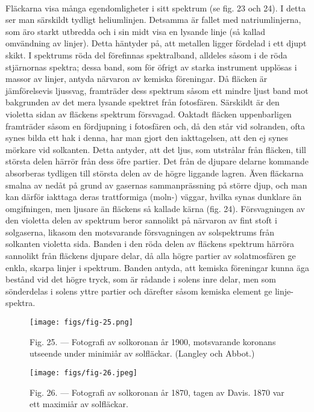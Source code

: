 \documentclass[a4paper, 12pt, oneside, swedish]{article}
\begin{document}
\paragraph{}
Fläckarna visa många egendomligheter i sitt spektrum (se fig. 23 och 24). I detta ser man särskildt tydligt heliumlinjen. Detsamma är fallet med natriumlinjerna, som äro starkt utbredda och i sin midt visa en lysande linje (så kallad omvändning av linjer). Detta häntyder på, att metallen ligger fördelad i ett djupt skikt. I spektrums röda del förefinnas spektralband, alldeles såsom i de röda stjärnornas spektra; dessa band, som för öfrigt av starka instrument upplösas i massor av linjer, antyda närvaron av kemiska föreningar. Då fläcken är jämförelsevis ljussvag, framträder dess spektrum såsom ett mindre ljust band mot bakgrunden av det mera lysande spektret från fotosfären. Särskildt är den violetta sidan av fläckens spektrum försvagad. Oaktadt fläcken uppenbarligen framträder såsom en fördjupning i fotosfären och, då den står vid solranden, ofta synes bilda ett hak i denna, har man gjort den iakttagelsen, att den ej synes mörkare vid solkanten. Detta antyder, att det ljus, som utstrålar från fläcken, till största delen härrör från dess öfre partier. Det från de djupare delarne kommande absorberas tydligen till största delen av de högre liggande lagren. Även fläckarna smalna av nedåt på grund av gasernas sammanprässning på större djup, och man kan därför iakttaga deras trattformiga (moln-) väggar, hvilka synas dunklare än omgifningen, men ljusare än fläckens så kallade kärna (fig. 24). Försvagningen av den violetta delen av spektrum beror sannolikt på närvaron av fint stoft i solgaserna, likasom den motsvarande försvagningen av solspektrums från solkanten violetta sida. Banden i den röda delen av fläckens spektrum härröra sannolikt från fläckens djupare delar, då alla högre partier av solatmosfären ge enkla, skarpa linjer i spektrum. Banden antyda, att kemiska föreningar kunna äga bestånd vid det högre tryck, som är rådande i solens inre delar, men som sönderdelas i solens yttre partier och därefter såsom kemiska element ge linje-spektra.

\begin{figure}[H]
\centering
\texttt{[image: figs/fig-25.png]}
\caption{Fig. 25. --- Fotografi av solkoronan år 1900, motsvarande koronans utseende under minimiår av solfläckar. (Langley och Abbot.)}
\end{figure}

\begin{figure}[H]
\centering
\texttt{[image: figs/fig-26.jpeg]}
\caption{Fig. 26. --- Fotografi av solkoronan år 1870, tagen av Davis. 1870 var ett maximiår av solfläckar.}
\end{figure}
\end{document}
